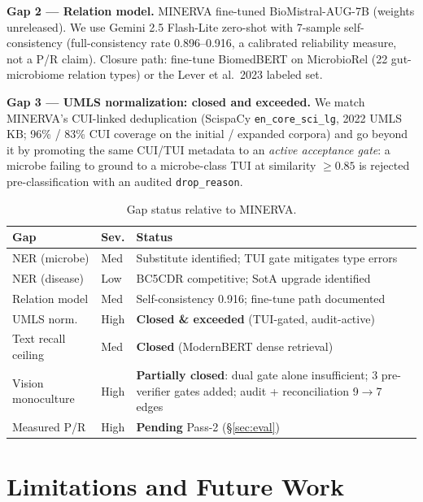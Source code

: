 \documentclass[10pt,twocolumn,letterpaper]{article}
\begin{document}
\noindent\textbf{Gap 2 --- Relation model.} MINERVA fine-tuned
BioMistral-AUG-7B (weights unreleased). We use Gemini 2.5 Flash-Lite
zero-shot with 7-sample self-consistency (full-consistency rate 0.896--0.916,
a calibrated reliability measure, not a P/R claim). Closure path: fine-tune
BiomedBERT on MicrobioRel (22 gut-microbiome relation types) or the Lever
et al.\ 2023 labeled set.

\noindent\textbf{Gap 3 --- UMLS normalization: closed and exceeded.} We match
MINERVA's CUI-linked deduplication (ScispaCy \texttt{en\_core\_sci\_lg},
2022 UMLS KB; 96\% / 83\% CUI coverage on the initial / expanded corpora) and
go beyond it by promoting the same CUI/TUI metadata to an \emph{active
acceptance gate}: a microbe failing to ground to a microbe-class TUI at
similarity $\geq 0.85$ is rejected pre-classification with an audited
\texttt{drop\_reason}.

\begin{table}[t]
\centering
\small
\caption{Gap status relative to MINERVA.}
\label{tab:gap}
\begin{tabular}{@{}p{}p{}p{}@{}}
\toprule
\textbf{Gap} & \textbf{Sev.} & \textbf{Status} \\
\midrule
NER (microbe) & Med & Substitute identified; TUI gate mitigates type errors \\
NER (disease) & Low & BC5CDR competitive; SotA upgrade identified \\
Relation model & Med & Self-consistency 0.916; fine-tune path documented \\
UMLS norm. & High & \textbf{Closed \& exceeded} (TUI-gated, audit-active) \\
Text recall ceiling & Med & \textbf{Closed} (ModernBERT dense retrieval) \\
Vision monoculture & High & \textbf{Partially closed}: dual gate alone
insufficient; 3 pre-verifier gates added; audit + reconciliation
9$\rightarrow$7 edges \\
Measured P/R & High & \textbf{Pending} Pass-2 (\S\ref{sec:eval}) \\
\bottomrule
\end{tabular}
\end{table}

\section{Limitations and Future Work}
\end{document}
